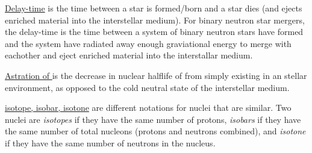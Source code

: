\underline{Delay-time} is the time between a star is formed/born and a star dies (and ejects enriched material into the interstellar medium).
For binary neutron star mergers, the delay-time is the time between a system of binary neutron stars have formed and the system have radiated away enough graviational energy to merge with eachother and eject enriched material into the interstallar medium.

\underline{Astration of } is the decrease in nuclear halflife of  from simply existing in an stellar environment, as opposed to the cold neutral state of the interstellar medium.

\underline{isotope, isobar, isotone} are different notations for nuclei that are similar. Two nuclei are \textit{isotopes} if they have the same number of protons, \textit{isobars} if they have the same number of total nucleons (protons and neutrons combined), and \textit{isotone} if they have the same number of neutrons in the nucleus.


